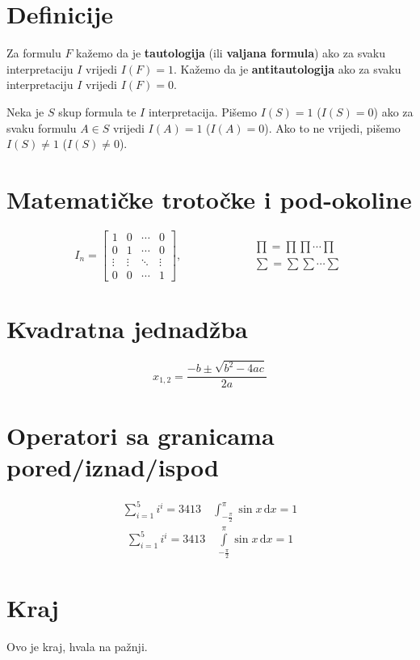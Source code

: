 \documentclass[10pt]{scrartcl}
\begin{document}
\section{Definicije}
\begin{definicija}
Za formulu $F$ kažemo da je \textbf{tautologija} (ili \textbf{valjana formula}) ako za svaku interpretaciju $I$ vrijedi $I(F) = 1$. Kažemo da je \textbf{antitautologija} ako za svaku interpretaciju $I$ vrijedi $I(F) = 0$.
\end{definicija}
\begin{definicija}
Neka je $S$ skup formula te $I$ interpretacija. Pišemo $I(S) = 1$ ($I(S) = 0$) ako za svaku formulu $A \in S$ vrijedi $I(A) = 1$ ($I(A) = 0$). Ako to ne vrijedi, pišemo $I(S) \not= 1$ ($I(S) \not= 0$).
\end{definicija}

\section{Matematičke trotočke i pod-okoline}
\begin{equation}
I_n=\left[\begin{array}{cccc}
1 & 0 & \cdots & 0 \\
0 & 1 & \cdots & 0 \\
\vdots & \vdots & \ddots & \vdots \\
0 & 0 & \cdots & 1
\end{array}\right]
,\quad\quad\quad\quad\quad\quad
\begin{gathered}
\prod=\prod\prod\dotsi\prod\\
\sum=\sum\sum\dotsi\sum 
\end{gathered}
\end{equation}

\section{Kvadratna jednadžba}
\begin{equation}
x_{1,2}=\dfrac{-b\pm\sqrt{b^2-4ac}}{2a}
\end{equation}

\section{Operatori sa granicama pored/iznad/ispod}
\begin{equation}\label{eq:referenca}
\begin{gathered}
\sum\nolimits_{i=1}^{5}i^i=3413
\quad
\int\nolimits_{-\frac{\pi}{2}}^\pi{\sin x}\,\mathrm{d}x = 1
\end{gathered}\tag{\Telefon}
\end{equation}
\begin{equation}
\begin{gathered}
\sum\limits_{i=1}^{5}i^i=3413
\quad
\int\limits_{-\frac{\pi}{2}}^\pi{\sin x}\,\mathrm{d}x = 1
\end{gathered}
\end{equation}

\section{Kraj}\label{sec:kraj}
Ovo je kraj, hvala na pažnji. \Smiley
\end{document}

